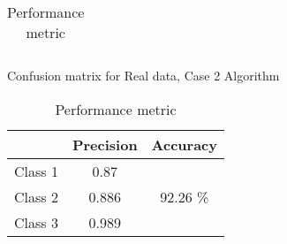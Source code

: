 \documentclass[11pt,paper=a4,answers]{exam}
\begin{document}
\begin{questions}
\begin{enumerate}[i.]
\begin{enumerate}
\begin{table}[ht]
\begin{tabular}{c | c c c c | c | c |}
                    \end{tabular}
                    \caption{Confusion matrix for Real data, Case 2 Algorithm}
                    \label{tab:rdcon2}
                \endminipage\hfill
                    \begin{tabular}{| l | c | c |}
                        \hline
                        & Precision & Accuracy\\
                        \hline
                        Class 1 & 0.87 & \\
                        \cline{1-2}
                        Class 2 & 0.886 & 92.26 \%\\
                        \cline{1-2}
                        Class 3 & 0.989 & \\
                        \hline
                    \end{tabular}
                    \caption{Performance metric}
                \endminipage\hfill
            \end{table}\\


\end{enumerate}
\end{enumerate}
\end{questions}
\end{document}
